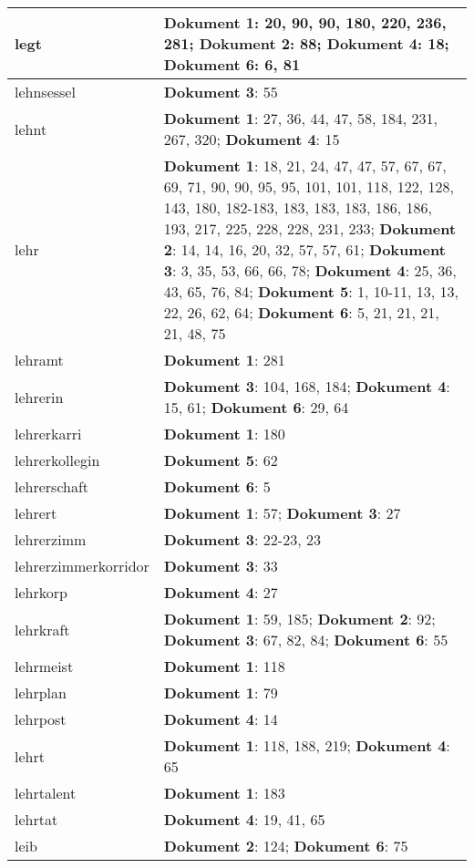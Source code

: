 \documentclass[a5paper]{article}
\begin{document}
\begin{longtable}[l]{|l|p{3in}|}
\hline
legt & \textbf{Dokument 1}: 20, 90, 90, 180, 220, 236, 281; \textbf{Dokument 2}: 88; \textbf{Dokument 4}: 18; \textbf{Dokument 6}: 6, 81 \\
\hline
lehnsessel & \textbf{Dokument 3}: 55 \\
\hline
lehnt & \textbf{Dokument 1}: 27, 36, 44, 47, 58, 184, 231, 267, 320; \textbf{Dokument 4}: 15 \\
\hline
lehr & \textbf{Dokument 1}: 18, 21, 24, 47, 47, 57, 67, 67, 69, 71, 90, 90, 95, 95, 101, 101, 118, 122, 128, 143, 180, 182-183, 183, 183, 183, 186, 186, 193, 217, 225, 228, 228, 231, 233; \textbf{Dokument 2}: 14, 14, 16, 20, 32, 57, 57, 61; \textbf{Dokument 3}: 3, 35, 53, 66, 66, 78; \textbf{Dokument 4}: 25, 36, 43, 65, 76, 84; \textbf{Dokument 5}: 1, 10-11, 13, 13, 22, 26, 62, 64; \textbf{Dokument 6}: 5, 21, 21, 21, 21, 48, 75 \\
\hline
lehramt & \textbf{Dokument 1}: 281 \\
\hline
lehrerin & \textbf{Dokument 3}: 104, 168, 184; \textbf{Dokument 4}: 15, 61; \textbf{Dokument 6}: 29, 64 \\
\hline
lehrerkarri & \textbf{Dokument 1}: 180 \\
\hline
lehrerkollegin & \textbf{Dokument 5}: 62 \\
\hline
lehrerschaft & \textbf{Dokument 6}: 5 \\
\hline
lehrert & \textbf{Dokument 1}: 57; \textbf{Dokument 3}: 27 \\
\hline
lehrerzimm & \textbf{Dokument 3}: 22-23, 23 \\
\hline
lehrerzimmerkorridor & \textbf{Dokument 3}: 33 \\
\hline
lehrkorp & \textbf{Dokument 4}: 27 \\
\hline
lehrkraft & \textbf{Dokument 1}: 59, 185; \textbf{Dokument 2}: 92; \textbf{Dokument 3}: 67, 82, 84; \textbf{Dokument 6}: 55 \\
\hline
lehrmeist & \textbf{Dokument 1}: 118 \\
\hline
lehrplan & \textbf{Dokument 1}: 79 \\
\hline
lehrpost & \textbf{Dokument 4}: 14 \\
\hline
lehrt & \textbf{Dokument 1}: 118, 188, 219; \textbf{Dokument 4}: 65 \\
\hline
lehrtalent & \textbf{Dokument 1}: 183 \\
\hline
lehrtat & \textbf{Dokument 4}: 19, 41, 65 \\
\hline
leib & \textbf{Dokument 2}: 124; \textbf{Dokument 6}: 75 \\

\end{longtable}
\end{document}
